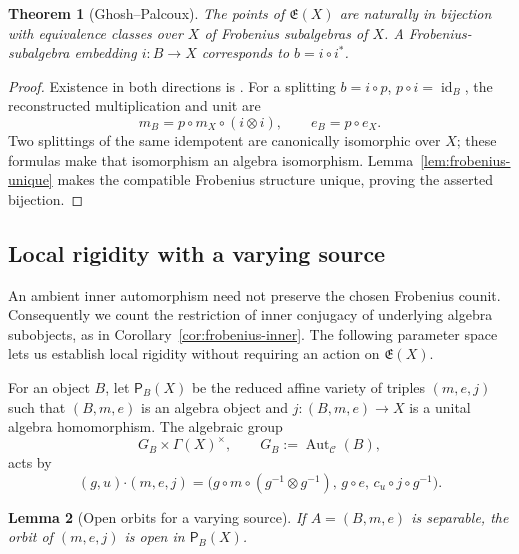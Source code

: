 \documentclass[11pt]{amsart}
\newtheorem{theorem}{Theorem}[section]
\newtheorem{lemma}[theorem]{Lemma}
\theoremstyle{definition}
\theoremstyle{remark}
\newcommand{\C}{\mathcal C}
\newcommand{\Exch}{\mathfrak E}
\DeclareMathOperator{\Aut}{Aut}
\DeclareMathOperator{\id}{id}
\begin{document}
\begin{theorem}[Ghosh--Palcoux]\label{thm:exchange-correspondence}
The points of $\Exch(X)$ are naturally in bijection with equivalence
classes over $X$ of Frobenius subalgebras of $X$.  A Frobenius-subalgebra
embedding $i:B\to X$ corresponds to $b=i\circ i^*$.
\end{theorem}

\begin{proof}
Existence in both directions is
\cite[Theorem~4.1]{GhoshPalcouxExchange}.  For a splitting $b=i\circ p$,
$p\circ i=\id_B$, the reconstructed multiplication and unit are
\[
 m_B=p\circ m_X\circ(i\otimes i),\qquad e_B=p\circ e_X.
\]
Two splittings of the same idempotent are canonically isomorphic over $X$;
these formulas make that isomorphism an algebra isomorphism.
Lemma~\ref{lem:frobenius-unique} makes the compatible Frobenius structure
unique, proving the asserted bijection.
\end{proof}


\subsection{Local rigidity with a varying source}

An ambient inner automorphism need not preserve the chosen Frobenius
counit.  Consequently we count the restriction of inner conjugacy of
underlying algebra subobjects, as in Corollary~\ref{cor:frobenius-inner}.
The following parameter space lets us establish local rigidity without
requiring an action on $\Exch(X)$.

For an object $B$, let $\mathsf P_B(X)$ be the reduced affine variety of
triples $(m,e,j)$ such that $(B,m,e)$ is an algebra object and
$j:(B,m,e)\to X$ is a unital algebra homomorphism.
The algebraic group
\[
 G_B\times\Gamma(X)^\times,
 \qquad G_B:=\Aut_{\C}(B),
\]
acts by
\begin{equation}\label{eq:joint-action}
 (g,u)\boldsymbol\cdot(m,e,j)
 =\bigl(g\circ m\circ(g^{-1}\otimes g^{-1}),\,
        g\circ e,\,c_u\circ j\circ g^{-1}\bigr).
\end{equation}

\begin{lemma}[Open orbits for a varying source]\label{lem:joint-open-orbit}
If $A=(B,m,e)$ is separable, the orbit of $(m,e,j)$ is open in
$\mathsf P_B(X)$.
\end{lemma}
\end{document}
